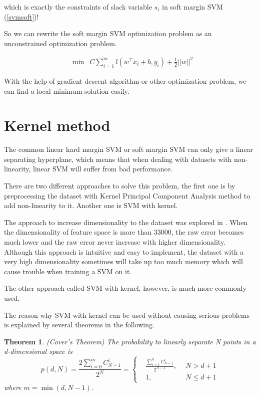 \documentclass[a4paper]{report}
\newtheorem{theorem}{Theorem}[section]
\begin{document}
which is exactly the constraints of slack variable $s_i$ in soft margin SVM (\ref{svmsoft})!

So we can rewrite the soft margin SVM optimization problem as an unconstrained optimization problem.

\begin{align*}
    &\min & C \sum_{i=1}^m l(w^\top x_i+b, y_i) + \frac{1}{2}||w||^2 
\end{align*}

With the help of gradient descent algorithm or other optimization problem, we can find a local minimum solution easily.

\section{Kernel method}

The common linear hard margin SVM or soft margin SVM can only give a linear separating hyperplane, which means that when dealing with datasets with non-linearity, linear SVM will suffer from bad performance.

There are two different approaches to solve this problem, the first one is by preprocessing the dataset with Kernel Principal Component Analysis method to add non-linearity to it. Another one is SVM with kernel.

The approach to increase dimensionality to the dataset was explored in \cite{cortes1995support}. When the dimensionality of feature space is more than 33000, the raw error becomes much lower and the raw error never increase with higher dimensionality. Although this approach is intuitive and easy to implement, the dataset with a very high dimensionality sometimes will take up too much memory which will cause trouble when training a SVM on it. 

The other approach called SVM with kernel, however, is much more commonly used.

The reason why SVM with kernel can be used without causing serious problems is explained by several theorems in the following.

\begin{theorem}
    (Cover's Theorem\cite{cover1965geometrical}) The probability to linearly separate N points in a d-dimensional space is
    \[
        p(d,N)=\frac{2\sum_{i=0}^mC_{N-1}^i}{2^N}=\left\{ 
        \begin{aligned}
            &\frac{\sum_{i=1}^dC^i_{N-1}}{2^{N-1}},\ \ &N>d+1 \\ &1,\ \ &N\le d+1
        \end{aligned} \right.
    \]
    where $m=\min(d,N-1)$.
\end{theorem}
\end{document}
